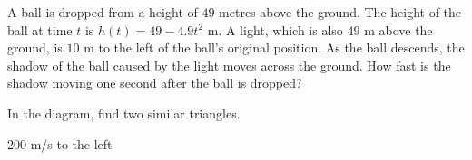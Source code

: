 \begin{Mquestion}[1996D]
A ball is dropped from a height of $49$ metres above the ground. The
height of the ball at time $t$ is $h(t)=49-4.9 t^2$ m. A light, which is
also $49$ m above the ground, is $10$ m to the left of the ball's original
position. As the ball descends, the shadow of the ball caused by the light
moves across the ground. How fast is the shadow moving one second after
the ball is dropped?

\begin{center}
\end{center}
\end{Mquestion}
\begin{hint} In the diagram, find two similar triangles.
\end{hint}
\begin{answer} 200 m/s to the left
\end{answer}

